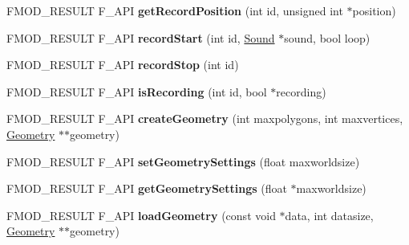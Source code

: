 \begin{DoxyCompactItemize}
\item 
\hypertarget{class_f_m_o_d_1_1_system_a508b2368e0c8d9d7d582b89e957c5b5b}{F\+M\+O\+D\+\_\+\+R\+E\+S\+U\+L\+T F\+\_\+\+A\+P\+I {\bfseries get\+Record\+Position} (int id, unsigned int $\ast$position)}\label{class_f_m_o_d_1_1_system_a508b2368e0c8d9d7d582b89e957c5b5b}

\item 
\hypertarget{class_f_m_o_d_1_1_system_a244b4cd7c917fa73354a0b1579003e15}{F\+M\+O\+D\+\_\+\+R\+E\+S\+U\+L\+T F\+\_\+\+A\+P\+I {\bfseries record\+Start} (int id, \hyperlink{class_f_m_o_d_1_1_sound}{Sound} $\ast$sound, bool loop)}\label{class_f_m_o_d_1_1_system_a244b4cd7c917fa73354a0b1579003e15}

\item 
\hypertarget{class_f_m_o_d_1_1_system_a8fb57bf64f8e40ea7e0183cec6765c0f}{F\+M\+O\+D\+\_\+\+R\+E\+S\+U\+L\+T F\+\_\+\+A\+P\+I {\bfseries record\+Stop} (int id)}\label{class_f_m_o_d_1_1_system_a8fb57bf64f8e40ea7e0183cec6765c0f}

\item 
\hypertarget{class_f_m_o_d_1_1_system_a30d96283b97941279b8896a5993c6592}{F\+M\+O\+D\+\_\+\+R\+E\+S\+U\+L\+T F\+\_\+\+A\+P\+I {\bfseries is\+Recording} (int id, bool $\ast$recording)}\label{class_f_m_o_d_1_1_system_a30d96283b97941279b8896a5993c6592}

\item 
\hypertarget{class_f_m_o_d_1_1_system_a3652e6e628a0b634f3670d40fde05938}{F\+M\+O\+D\+\_\+\+R\+E\+S\+U\+L\+T F\+\_\+\+A\+P\+I {\bfseries create\+Geometry} (int maxpolygons, int maxvertices, \hyperlink{class_f_m_o_d_1_1_geometry}{Geometry} $\ast$$\ast$geometry)}\label{class_f_m_o_d_1_1_system_a3652e6e628a0b634f3670d40fde05938}

\item 
\hypertarget{class_f_m_o_d_1_1_system_a421603edcdc170de9d72d8ab95ee0fbd}{F\+M\+O\+D\+\_\+\+R\+E\+S\+U\+L\+T F\+\_\+\+A\+P\+I {\bfseries set\+Geometry\+Settings} (float maxworldsize)}\label{class_f_m_o_d_1_1_system_a421603edcdc170de9d72d8ab95ee0fbd}

\item 
\hypertarget{class_f_m_o_d_1_1_system_a4466ede69006041d702b6ac5be162c57}{F\+M\+O\+D\+\_\+\+R\+E\+S\+U\+L\+T F\+\_\+\+A\+P\+I {\bfseries get\+Geometry\+Settings} (float $\ast$maxworldsize)}\label{class_f_m_o_d_1_1_system_a4466ede69006041d702b6ac5be162c57}

\item 
\hypertarget{class_f_m_o_d_1_1_system_af9aa1402e3132a854037625ea6fabd4e}{F\+M\+O\+D\+\_\+\+R\+E\+S\+U\+L\+T F\+\_\+\+A\+P\+I {\bfseries load\+Geometry} (const void $\ast$data, int datasize, \hyperlink{class_f_m_o_d_1_1_geometry}{Geometry} $\ast$$\ast$geometry)}\label{class_f_m_o_d_1_1_system_af9aa1402e3132a854037625ea6fabd4e}


\end{DoxyCompactItemize}

